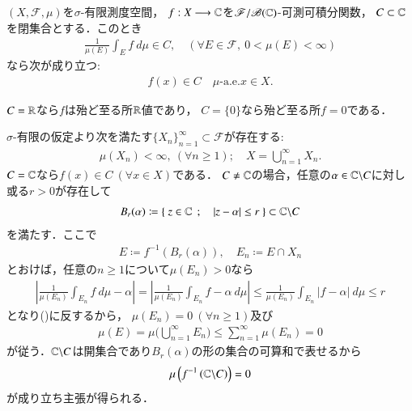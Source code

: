 	\begin{screen}
		\begin{thm}[積分の平均値と写像の値域の関係]\label{thm:mean_value_of_integral_and_closed_set}
			$(X,\mathscr{F},\mu)$を$\sigma$-有限測度空間，
			$f:X \longrightarrow \mathbb{C}$を$\mathscr{F}/\mathscr{B}(\mathbb{C})$-可測可積分関数，
			$C \subset \mathbb{C}$を閉集合とする．このとき
			\begin{align}
				\frac{1}{\mu(E)}\int_E f\ d\mu \in C,
				\quad (\forall E \in \mathscr{F},\ 0 < \mu(E) < \infty)
				\label{eq:thm_mean_value_of_integral_and_closed_set}
			\end{align}
			なら次が成り立つ:
			\begin{align}
				f(x) \in C \quad \mbox{$\mu$-a.e.}x \in X.
			\end{align}
		\end{thm}
	\end{screen}
	$C=\mathbb{R}$なら$f$は殆ど至る所$\mathbb{R}$値であり，
	$C=\{0\}$なら殆ど至る所$f=0$である．
	\begin{prf}
		$\sigma$-有限の仮定より次を満たす$\{X_n\}_{n=1}^\infty \subset \mathscr{F}$が存在する:
		\begin{align}
			\mu(X_n) < \infty,\ (\forall n \geq 1);
			\quad X = \bigcup_{n=1}^\infty X_n.
		\end{align}
		$C = \mathbb{C}$なら$f(x) \in C\ (\forall x \in X)$である．
		$C \neq \mathbb{C}$の場合，任意の$\alpha \in \mathbb{C} \backslash C$に対し
		或る$r > 0$が存在して
		\begin{align}
			B_r(\alpha) \coloneqq \left\{\ z \in \mathbb{C}\ \, ; \quad |z - \alpha| \leq r\ \right\} \subset \mathbb{C} \backslash C
		\end{align}
		を満たす．ここで
		\begin{align}
			E \coloneqq f^{-1}\left( B_r(\alpha) \right),
			\quad E_n \coloneqq E \cap X_n
		\end{align}
		とおけば，任意の$n \geq 1$について$\mu(E_n) > 0$なら
		\begin{align}
			\left| \frac{1}{\mu(E_n)}\int_{E_n} f\ d\mu - \alpha \right|
			= \left| \frac{1}{\mu(E_n)}\int_{E_n} f - \alpha\ d\mu \right|
			\leq \frac{1}{\mu(E_n)}\int_{E_n} |f - \alpha|\ d\mu
			\leq r
		\end{align}
		となり()に反するから，
		$\mu(E_n) = 0\ (\forall n \geq 1)$及び
		\begin{align}
			\mu(E) = \mu\Biggl( \bigcup_{n=1}^\infty E_n \Biggr) 
			\leq \sum_{n=1}^\infty \mu(E_n) = 0
		\end{align}
		が従う．$\mathbb{C} \backslash C$は開集合であり$B_r(\alpha)$の形の集合の可算和で表せるから
		\begin{align}
			\mu\left( f^{-1}\left( \mathbb{C} \backslash C \right) \right) = 0
		\end{align}
		が成り立ち主張が得られる．
		\QED
	\end{prf}